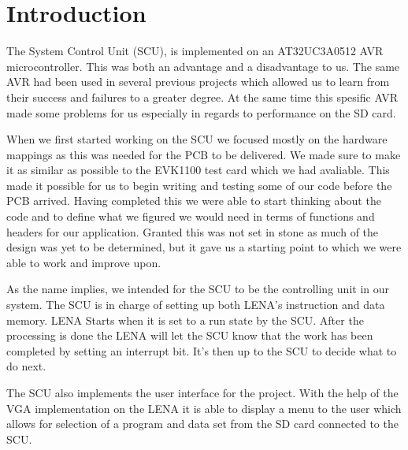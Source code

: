 \section{Introduction}

The System Control Unit (SCU), is implemented on an AT32UC3A0512 AVR microcontroller. This was both an advantage and a disadvantage to us. The same AVR had been used in several previous projects which allowed us to learn from their success and failures to a greater degree. At the same time this spesific AVR made some problems for us especially in regards to performance on the SD card. 

When we first started working on the SCU we focused mostly on the hardware mappings as this was needed for the PCB to be delivered. We made sure to make it as similar as possible to the EVK1100 test card which we had avaliable. This made it possible for us to begin writing and testing some of our code before the PCB arrived. Having completed this we were able to start thinking about the code and to define what we figured we would need in terms of functions and headers for our application. Granted this was not set in stone as much of the design was yet to be determined, but it gave us a starting point to which we were able to work and improve upon.

As the name implies, we intended for the SCU to be the controlling unit in our system. The SCU is in charge of setting up both LENA's instruction and data memory. LENA Starts when it is set to a run state by the SCU. After the processing is done the LENA will let the SCU know that the work has been completed by setting an interrupt bit. It's then up to the SCU to decide what to do next. 

The SCU also implements the user interface for the project. With the help of the VGA implementation on the LENA it is able to display a menu to the user which allows for selection of a program and data set from the SD card connected to the SCU.

